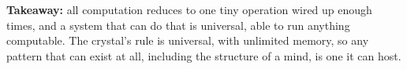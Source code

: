 \textbf{Takeaway:} all computation reduces to one tiny operation wired up enough times, and a system that can do that is universal, able to run anything computable. The crystal's rule is universal, with unlimited memory, so any pattern that can exist at all, including the structure of a mind, is one it can host.
